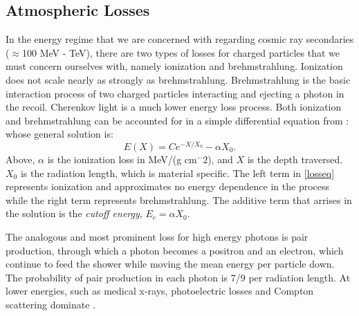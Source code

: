 \subsection{Atmospheric Losses}
In the energy regime that we are concerned with regarding cosmic ray secondaries ($\approx$100 MeV - TeV), there are two types of losses for charged particles that we must concern ourselves with, namely ionization and brehmstrahlung. Ionization does not scale nearly as strongly as brehmstrahlung. Brehmstrahlung is the basic interaction process of two charged particles interacting and ejecting a photon in the recoil. Cherenkov light is a much lower energy loss process. Both ionization and brehmstrahlung can be accounted for in a simple differential equation from \textcite{crapp2}:
whose general solution is:
$$E(X)=C e^{-X/X_0}-\alpha X_0.$$
Above, $\alpha$ is the ionization loss in MeV/(g cm$^-2$), and $X$ is the depth traversed. $X_0$ is the radiation length, which is material specific. The left term in \autoref{losseq} represents ionization and approximates no energy dependence in the process while the right term represents brehmstrahlung. The additive term that arrises in the solution is the \textit{cutoff energy}, $E_c=\alpha X_0$.

The analogous and most prominent loss for high energy photons is pair production, through which a photon becomes a positron and an electron, which continue to feed the shower while moving the mean energy per particle down. The probability of pair production in each photon is 7/9 per radiation length. At lower energies, such as medical x-rays, photoelectric losses and Compton scattering dominate \cite{pdg}. 
